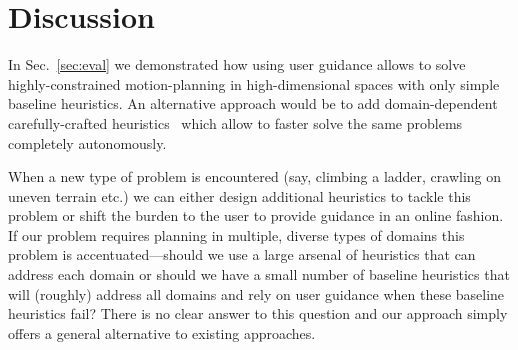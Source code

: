 \documentclass{article}
\begin{document}
\section{Discussion}
\label{sec:future}

In Sec.~\ref{sec:eval} we demonstrated how using user guidance allows to solve highly-constrained motion-planning in high-dimensional spaces with only simple baseline heuristics.
An alternative approach would be to add domain-dependent carefully-crafted heuristics~\cite{V17} which allow to faster solve the same problems completely autonomously.

When a new type of problem is encountered 
(say, climbing a ladder, crawling on uneven terrain etc.)
we can either design additional heuristics to tackle this problem or shift the burden to the user to provide guidance in an online fashion.
If our problem requires planning in multiple, diverse types of domains this problem is accentuated---should we  use a large arsenal of heuristics that can address each domain or should we have a small number of baseline heuristics that will (roughly) address all domains and rely on user guidance when these baseline heuristics fail?
There is no clear answer to this question and our approach simply offers a general alternative to existing approaches.


%


\newpage

%

%

\end{document}
